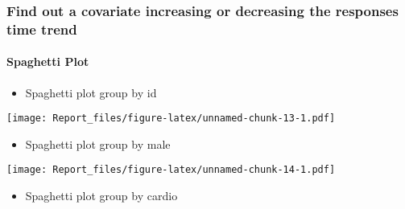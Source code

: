 \documentclass[
]{article}
\newenvironment{Shaded}{\begin{snugshade}}{\end{snugshade}}
\newcommand{\AttributeTok}[1]{\textcolor[rgb]{0.77,0.63,0.00}{#1}}
\newcommand{\CommentTok}[1]{\textcolor[rgb]{0.56,0.35,0.01}{\textit{#1}}}
\newcommand{\DecValTok}[1]{\textcolor[rgb]{0.00,0.00,0.81}{#1}}
\newcommand{\FunctionTok}[1]{\textcolor[rgb]{0.00,0.00,0.00}{#1}}
\newcommand{\NormalTok}[1]{#1}
\newcommand{\OtherTok}[1]{\textcolor[rgb]{0.56,0.35,0.01}{#1}}
\newcommand{\SpecialCharTok}[1]{\textcolor[rgb]{0.00,0.00,0.00}{#1}}
\providecommand{\tightlist}{%
  \setlength{\itemsep}{0pt}\setlength{\parskip}{0pt}}
\begin{document}
\hypertarget{find-out-a-covariate-increasing-or-decreasing-the-responses-time-trend}{%
\subsubsection{Find out a covariate increasing or decreasing the
responses time
trend}\label{find-out-a-covariate-increasing-or-decreasing-the-responses-time-trend}}

\hypertarget{spaghetti-plot}{%
\paragraph{Spaghetti Plot}\label{spaghetti-plot}}

\begin{Shaded}
\end{Shaded}

\begin{itemize}
\tightlist
\item
  Spaghetti plot group by id
\end{itemize}

\texttt{[image: Report\_files/figure-latex/unnamed-chunk-13-1.pdf]}

\begin{itemize}
\tightlist
\item
  Spaghetti plot group by male
\end{itemize}

\texttt{[image: Report\_files/figure-latex/unnamed-chunk-14-1.pdf]}

\begin{itemize}
\tightlist
\item
  Spaghetti plot group by cardio
\end{itemize}
\end{document}
